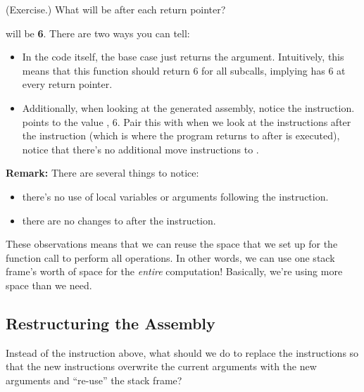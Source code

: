 \begin{mdframed}
    (Exercise.) What will  be after each return pointer? 

    \begin{mdframed}
         will be \textbf{6}. There are two ways you can tell: 
        \begin{itemize}
            \item In the code itself, the base case just returns the  argument. Intuitively, this means that this function should return 6 for all subcalls, implying  has 6 at every return pointer. 
            \item Additionally, when looking at the generated assembly, notice the  instruction. \code{[rsp + 32]} points to the value , 6. Pair this with when we look at the instructions after the  instruction (which is where the program returns to after  is executed), notice that there's no additional move instructions to . 
        \end{itemize}
    \end{mdframed}
\end{mdframed}
\textbf{Remark:} There are several things to notice:
\begin{itemize}
    \item there's no use of local variables or arguments following the  instruction. 
    \item there are no changes to  after the  instruction.
\end{itemize}
These observations means that we can reuse the space that we set up for the function call to perform all operations. In other words, we can use one stack frame's worth of space for the \emph{entire} computation! Basically, we're using more space than we need. 

\subsection{Restructuring the Assembly}
Instead of the  instruction above, what should we do to replace the instructions so that the new instructions overwrite the current arguments with the new arguments and ``re-use'' the stack frame? 

\bigskip 

